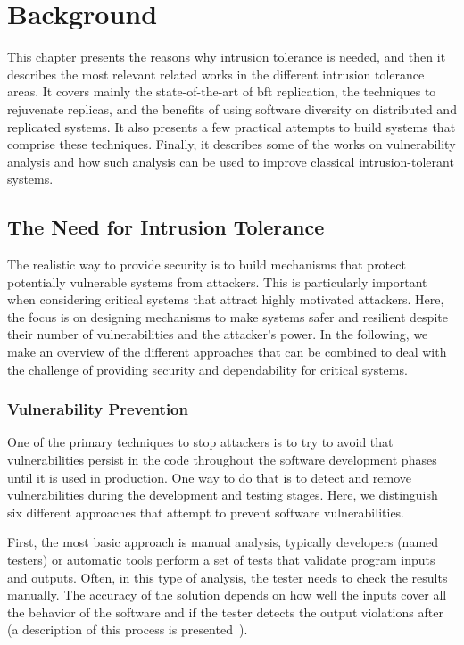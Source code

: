 \chapter{Background}
\label{chap:related_work}


This chapter presents the reasons why intrusion tolerance is needed, and then it describes the most relevant related works in the different intrusion tolerance areas.
It covers mainly the state-of-the-art of \gls{bft} replication, the techniques to rejuvenate replicas, and the benefits of using software diversity on distributed and replicated systems.
It also presents a few practical attempts to build systems that comprise these techniques.
Finally, it describes some of the works on vulnerability analysis and how such analysis can be used to improve classical intrusion-tolerant systems.


\section{The Need for Intrusion Tolerance}
The realistic way to provide security is to build mechanisms that protect potentially vulnerable systems from attackers.
This is particularly important when considering critical systems that attract highly motivated attackers. 
Here, the focus is on designing mechanisms to make systems safer and resilient despite their number of vulnerabilities and the attacker's power.
In the following, we make an overview of the different approaches that can be combined to deal with the challenge of providing security and dependability for critical systems.

\subsection{Vulnerability Prevention}
One of the primary techniques to stop attackers is to try to avoid that vulnerabilities persist in the code throughout the software development phases until it is used in production. 
One way to do that is to detect and remove vulnerabilities during the development and testing stages.
Here, we distinguish six different approaches that attempt to prevent software vulnerabilities. 

First, the most basic approach is manual analysis, typically developers (named testers) or automatic tools perform a set of tests that validate program inputs and outputs.
Often, in this type of analysis, the tester needs to check the results manually. 
The accuracy of the solution depends on how well the inputs cover all the behavior of the software and if the tester detects the output violations after (a description of this process is presented~\cite{Votipka:2018}).


